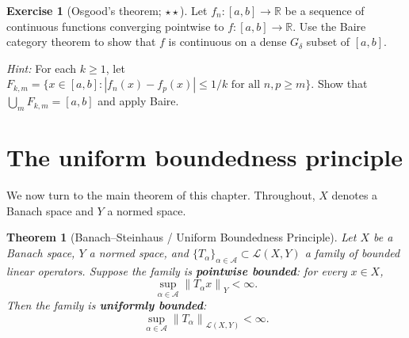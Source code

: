 \documentclass[a4paper,12pt]{book}
\newcommand{\R}{\mathbb{R}}
\newcommand{\norm}[1]{\left\| #1 \right\|}
\newcommand{\abs}[1]{\left| #1 \right|}
\theoremstyle{definition}
\newtheorem{exercise}{Exercise}[chapter]
\theoremstyle{plain}
\newtheorem{theorem}[definition]{Theorem}
\theoremstyle{remark}
\begin{document}
\begin{exercise}[Osgood's theorem; $\star\star$]\label{ex:osgood}
Let $f_n \colon [a,b] \to \R$ be a sequence of continuous functions converging
pointwise to $f \colon [a,b] \to \R$. Use the Baire category theorem to show that
$f$ is continuous on a dense $G_\delta$ subset of $[a,b]$.

\noindent\textit{Hint:} For each $k \geq 1$, let
$F_{k,m} = \{x \in [a,b] : \abs{f_n(x) - f_p(x)} \leq 1/k \text{ for all }
n,p \geq m\}$. Show that $\bigcup_m F_{k,m} = [a,b]$ and apply Baire.
\end{exercise}

\section{The uniform boundedness principle}\label{sec:ubp-statement}

We now turn to the main theorem of this chapter. Throughout, $X$ denotes a Banach
space and $Y$ a normed space.

\begin{theorem}[Banach--Steinhaus / Uniform Boundedness Principle]%
\label{thm:banach-steinhaus}
Let $X$ be a Banach space, $Y$ a normed space, and
$\{T_\alpha\}_{\alpha \in \mathcal{A}} \subset \mathcal{L}(X,Y)$ a family of bounded linear operators. Suppose the family is
\textbf{pointwise bounded}: for every $x \in X$,
\[
  \sup_{\alpha \in \mathcal{A}} \norm{T_\alpha x}_Y < \infty.
\]
Then the family is \textbf{uniformly bounded}:
\[
  \sup_{\alpha \in \mathcal{A}} \norm{T_\alpha}_{\mathcal{L}(X,Y)} < \infty.
\]
\end{theorem}
\end{document}
